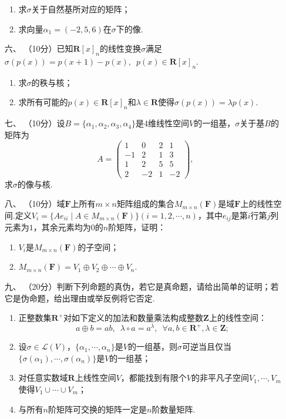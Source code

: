\begin{enumerate}
    \begin{enumerate}[label=(\arabic*)]
        \item 求$\sigma$关于自然基所对应的矩阵；
        \item 求向量$\alpha_1=(-2,5,6)$在$\sigma$下的像.
    \end{enumerate}
	\item[六、] （10分）已知$\mathbf{R}[x]_n$的线性变换$\sigma$满足$\sigma(p(x))=p(x+1)-p(x),\enspace p(x)\in\mathbf{R}[x]_n$.
	\begin{enumerate}[label=(\arabic*)]
        \item 求$\sigma$的秩与核；
        \item 求所有可能的$p(x)\in\mathbf{R}[x]_n$和$\lambda\in\mathbf{R}$使得$\sigma(p(x))=\lambda p(x)$.
    \end{enumerate}
	\item[七、]（10分）设$B=\{\alpha_1,\alpha_2,\alpha_3,\alpha_4\}$是4维线性空间$V$的一组基，$\sigma$关于基$B$的矩阵为
    \[A=\begin{pmatrix}1 & 0 & 2 & 1 \\ -1 & 2 & 1 & 3 \\ 1 & 2 & 5 & 5 \\ 2 & -2 & 1 & -2\end{pmatrix},\]
    求$\sigma$的像与核.
    \item[八、]（10分）域$\mathbf{F}$上所有$m\times n$矩阵组成的集合$M_{m\times n}(\mathbf{F})$是域$\mathbf{F}$上的线性空间.定义$V_i=\{Ae_{ii}\mid A\in M_{m\times n}(\mathbf{F})\}(i=1,2,\cdots,n)$，其中$e_{ij}$是第$i$行第$j$列元素为$1$，其余元素均为$0$的$n$阶矩阵，证明：
    \begin{enumerate}[label=(\arabic*)]
        \item $V_i$是$M_{m\times n}(\mathbf{F})$的子空间；
        \item $M_{m\times n}(\mathbf{F})=V_1\oplus V_2\oplus\cdots\oplus V_n$.
    \end{enumerate}
	\item[九、]（20分）判断下列命题的真伪，若它是真命题，请给出简单的证明；若它是伪命题，给出理由或举反例将它否定.
    \begin{enumerate}[label=(\arabic*)]
        \item 正整数集$\mathbf{R}^+$对如下定义的加法和数量乘法构成整数$\mathbf{Z}$上的线性空间：
        \[a\oplus b=ab,\enspace\lambda\circ a=a^\lambda,\enspace\forall a,b\in\mathbf{R}^+,\lambda\in\mathbf{Z};\]
        \item 设$\sigma\in\mathcal{L}(V)$，$\{\alpha_1,\cdots,\alpha_n\}$是$V$的一组基，则$\sigma$可逆当且仅当$\{\sigma(\alpha_1),\cdots,\sigma(\alpha_n)\}$是$V$的一组基；
        \item 对任意实数域$\mathbf{R}$上线性空间$V$，都能找到有限个$V$的非平凡子空间$V_1,\cdots,V_m$使得$V_1\cup\cdots\cup V_m$；
        \item 与所有$n$阶矩阵可交换的矩阵一定是$n$阶数量矩阵.
    \end{enumerate}
\end{enumerate}

\newpage
